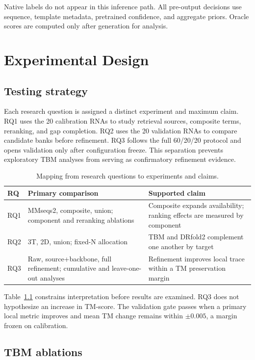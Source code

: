 \documentclass[12pt,a4paper,oneside]{report}
\begin{document}
Native labels do not appear in this inference path. All pre-output decisions use sequence,
template metadata, pretrained confidence, and aggregate priors. Oracle scores are
computed only after generation for analysis.

\chapter{Experimental Design}
\label{chap:experiment_en}

\section{Testing strategy}

Each research question is assigned a distinct experiment and maximum claim. RQ1 uses the
20 calibration RNAs to study retrieval sources, composite terms, reranking, and gap
completion. RQ2 uses the 20 validation RNAs to compare candidate banks before refinement.
RQ3 follows the full 60/20/20 protocol and opens validation only after configuration
freeze. This separation prevents exploratory TBM analyses from serving as confirmatory
refinement evidence.

\begin{table}[H]
\centering
\caption{Mapping from research questions to experiments and claims.}
\label{tab:rq_map_en}
\begin{tabularx}{\textwidth}{p{1.0cm}X X}
\toprule
RQ & Primary comparison & Supported claim \\
\midrule
RQ1 & MMseqs2, composite, union; component and reranking ablations & Composite expands availability; ranking effects are measured by component \\
RQ2 & 3T, 2D, union; fixed-N allocation & TBM and DRfold2 complement one another by target \\
RQ3 & Raw, source+backbone, full refinement; cumulative and leave-one-out analyses & Refinement improves local trace within a TM preservation margin \\
\bottomrule
\end{tabularx}
\end{table}

Table~\ref{tab:rq_map_en} constrains interpretation before results are examined. RQ3 does
not hypothesize an increase in TM-score. The validation gate passes when a primary local
metric improves and mean TM change remains within $\pm0.005$, a margin frozen on
calibration.

\section{TBM ablations}
\end{document}
